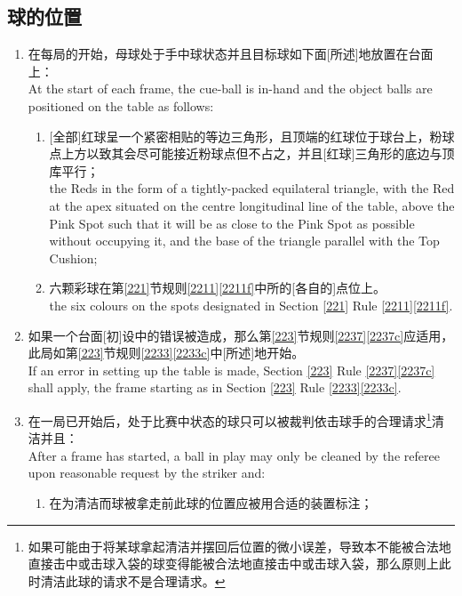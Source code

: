 \subsection{球的位置}\label{2232}

\begin{enumerate}[label=(\alph*)]
    \item 在每局的开始，母球处于手中球状态并且目标球如下面[所述]地放置在台面上：\\
    At the start of each frame, the cue-ball is in-hand and the object balls are positioned on the table as follows:
    \begin{enumerate}[label=(\roman*)]
        \item ${}$[全部]红球呈一个紧密相贴的等边三角形，且顶端的红球位于球台\longitudinalline{}上，粉球点上方以致其会尽可能接近粉球点但不占之，并且[红球]三角形的底边与顶库平行；\\
        the Reds in the form of a tightly-packed equilateral triangle, with the Red at the apex situated on the centre longitudinal line of the table, above the Pink Spot such that it will be as close to the Pink Spot as possible without occupying it, and the base of the triangle parallel with the Top Cushion;
        \item 六颗彩球在第\ref{221}节规则\ref{2211}\ref{2211f}中所\designate{}的[各自的]点位上。\\
        the six colours on the spots designated in Section \ref{221} Rule \ref{2211}\ref{2211f}.
    \end{enumerate}
    \item 如果一个台面[初]设中的错误被造成，那么第\ref{223}节规则\ref{2237}\ref{2237c}应适用，此局如第\ref{223}节规则\ref{2233}\ref{2233c}中[所述]地开始。\\
    If an error in setting up the table is made, Section \ref{223} Rule \ref{2237}\ref{2237c} shall apply, the frame starting as in Section \ref{223} Rule \ref{2233}\ref{2233c}.
    \item \label{2232c}在一局已开始后，处于比赛中状态的球只可以被裁判依击球手的合理请求\footnote{如果可能由于将某球拿起清洁并摆回后位置的微小误差，导致本不能被合法地直接击中或击球入袋的球变得能被合法地直接击中或击球入袋，那么原则上此时清洁此球的请求不是合理请求。}清洁并且：\\
    After a frame has started, a ball in play may only be cleaned by the referee upon reasonable request by the striker and:
    \begin{enumerate}[label=(\roman*)]
        \item 在为清洁而球被拿走前此球的位置应被用合适的装置标注；\\

\end{enumerate}
\end{enumerate}
